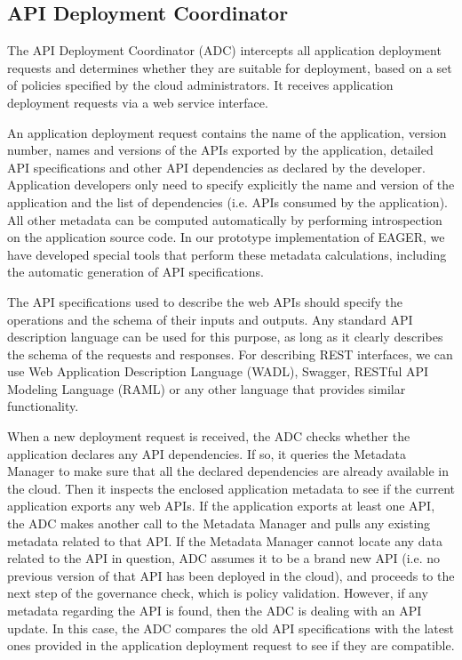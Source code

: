 \subsection{API Deployment Coordinator} 
The API Deployment Coordinator (ADC)
intercepts all application deployment requests and determines whether they are
suitable for deployment, based on a set of policies specified by the cloud
administrators. It receives application deployment requests via a web service
interface.

An application deployment request contains the name of the application,
version number, names and versions of the APIs exported by the application,
detailed API specifications and other API dependencies as declared by the
developer. Application developers only need to specify explicitly the name and
version of the application and the list of dependencies (i.e. APIs consumed by
the application). All other metadata can be computed automatically by
performing introspection on the application source code. In our prototype
implementation of EAGER, we have developed special tools that perform these
metadata calculations, including the automatic generation of API
specifications.

The API specifications used to describe the web APIs should specify the
operations and the schema of their inputs and outputs.  Any standard API
description language can be used for this purpose, as long as it clearly
describes the schema of the requests and responses. For describing REST
interfaces, we can use Web Application Description Language (WADL), Swagger,
RESTful API Modeling Language (RAML) or any other language that provides similar functionality. %

When a new deployment request is received, the ADC checks whether the
application declares any API dependencies. If so, it queries the Metadata
Manager to make sure that all the declared dependencies are already available
in the cloud.  Then it inspects the enclosed application metadata to see if
the current application exports any web APIs. If the application exports at
least one API, the ADC makes another call to the Metadata Manager and pulls
any existing metadata related to that API. If the Metadata Manager cannot
locate any data related to the API in question, ADC assumes it to be a brand
new API (i.e. no previous version of that API has been deployed in the cloud),
and proceeds to the next step of the governance check, which is policy
validation. However, if any metadata regarding the API is found, then the ADC
is dealing with an API update. In this case, the ADC compares the old API
specifications with the latest ones provided in the application deployment
request to see if they are compatible.

